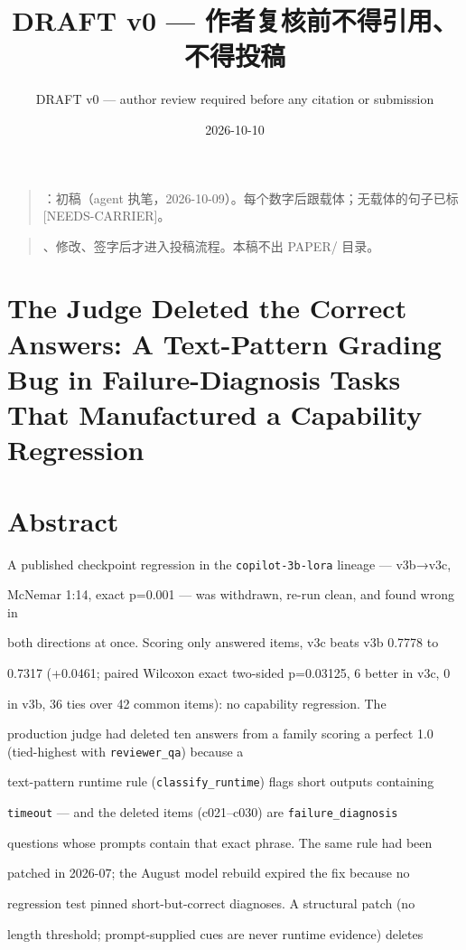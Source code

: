 \documentclass[11pt,a4paper]{article}
\begin{document}
\title{DRAFT v0 — 作者复核前不得引用、不得投稿}
\author{DRAFT v0 --- author review required before any citation or submission}
\date{2026-10-10}
\maketitle
\begin{quote}：初稿（agent 执笔，2026-10-09）。每个数字后跟载体；无载体的句子已标 [NEEDS-CARRIER]。\end{quote}
\begin{quote}、修改、签字后才进入投稿流程。本稿不出 PAPER/ 目录。\end{quote}
\section*{The Judge Deleted the Correct Answers: A Text-Pattern Grading Bug in Failure-Diagnosis Tasks That Manufactured a Capability Regression}
\section*{Abstract}
A published checkpoint regression in the \texttt{copilot-3b-lora} lineage — v3b→v3c,

McNemar 1:14, exact p=0.001 — was withdrawn, re-run clean, and found wrong in

both directions at once. Scoring only answered items, v3c beats v3b 0.7778 to

0.7317 (+0.0461; paired Wilcoxon exact two-sided p=0.03125, 6 better in v3c, 0

in v3b, 36 ties over 42 common items): no capability regression. The

production judge had deleted ten answers from a family scoring a perfect 1.0 (tied-highest with \texttt{reviewer\_qa}) because a

text-pattern runtime rule (\texttt{classify\_runtime}) flags short outputs containing

\texttt{timeout} — and the deleted items (c021–c030) are \texttt{failure\_diagnosis}

questions whose prompts contain that exact phrase. The same rule had been

patched in 2026-07; the August model rebuild expired the fix because no

regression test pinned short-but-correct diagnoses. A structural patch (no

length threshold; prompt-supplied cues are never runtime evidence) deletes
\end{document}
